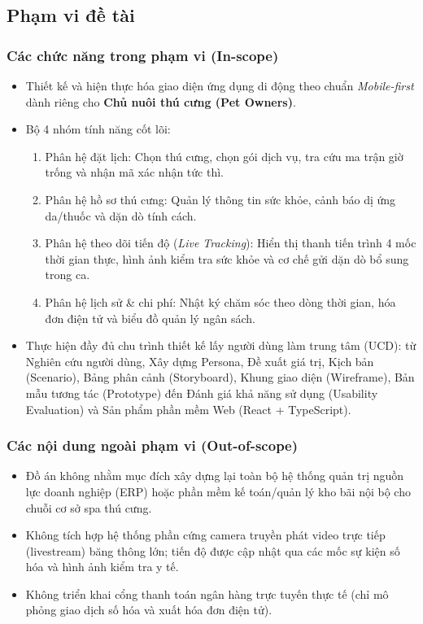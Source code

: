 \subsection{Phạm vi đề tài}
\subsubsection{Các chức năng trong phạm vi (In-scope)}
\begin{itemize}
    \item Thiết kế và hiện thực hóa giao diện ứng dụng di động theo chuẩn \textit{Mobile-first} dành riêng cho \textbf{Chủ nuôi thú cưng (Pet Owners)}.
    \item Bộ 4 nhóm tính năng cốt lõi:
    \begin{enumerate}
        \item Phân hệ đặt lịch: Chọn thú cưng, chọn gói dịch vụ, tra cứu ma trận giờ trống và nhận mã xác nhận tức thì.
        \item Phân hệ hồ sơ thú cưng: Quản lý thông tin sức khỏe, cảnh báo dị ứng da/thuốc và dặn dò tính cách.
        \item Phân hệ theo dõi tiến độ (\textit{Live Tracking}): Hiển thị thanh tiến trình 4 mốc thời gian thực, hình ảnh kiểm tra sức khỏe và cơ chế gửi dặn dò bổ sung trong ca.
        \item Phân hệ lịch sử \& chi phí: Nhật ký chăm sóc theo dòng thời gian, hóa đơn điện tử và biểu đồ quản lý ngân sách.
    \end{enumerate}
    \item Thực hiện đầy đủ chu trình thiết kế lấy người dùng làm trung tâm (UCD): từ Nghiên cứu người dùng, Xây dựng Persona, Đề xuất giá trị, Kịch bản (Scenario), Bảng phân cảnh (Storyboard), Khung giao diện (Wireframe), Bản mẫu tương tác (Prototype) đến Đánh giá khả năng sử dụng (Usability Evaluation) và Sản phẩm phần mềm Web (React + TypeScript).
\end{itemize}

\subsubsection{Các nội dung ngoài phạm vi (Out-of-scope)}
\begin{itemize}
    \item Đồ án không nhằm mục đích xây dựng lại toàn bộ hệ thống quản trị nguồn lực doanh nghiệp (ERP) hoặc phần mềm kế toán/quản lý kho bãi nội bộ cho chuỗi cơ sở spa thú cưng.
    \item Không tích hợp hệ thống phần cứng camera truyền phát video trực tiếp (livestream) băng thông lớn; tiến độ được cập nhật qua các mốc sự kiện số hóa và hình ảnh kiểm tra y tế.
    \item Không triển khai cổng thanh toán ngân hàng trực tuyến thực tế (chỉ mô phỏng giao dịch số hóa và xuất hóa đơn điện tử).
\end{itemize}

